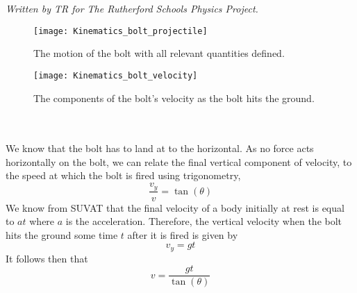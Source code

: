 
\begin{problem}[Tristan_Bolt_Thrower] %
{

 }
{\textit{Written by TR for The Rutherford Schools Physics Project.}}
{
\begin{figure}[h]
	\centering
	\texttt{[image: Kinematics\_bolt\_projectile]}
	\caption{The motion of the bolt with all relevant quantities defined.}
	\label{fig:Kinematics_projectile_arrow}
\end{figure}
\begin{figure}[h]
	\centering
	\texttt{[image: Kinematics\_bolt\_velocity]}
	\caption{The components of the bolt's velocity as the bolt hits the ground.}
	\label{fig:Kinematics_bolt_velocities}
\end{figure}
\\
\\
	We know that the bolt has to land at \quantity{\theta}{45\sup{\circ}} to the horizontal. As no force acts horizontally on the bolt, we can relate the final vertical component of velocity,  to the speed at which the bolt is fired using trigonometry,
	\begin{equation*}\frac{v_y}{v}=\tan(\theta)\end{equation*}
	We know from SUVAT that the final velocity of a body initially at rest is equal to $at$ where $a$ is the acceleration. Therefore, the vertical velocity when the bolt hits the ground some time $t$ after it is fired is given by
	\begin{equation*}v_y=gt\end{equation*}
	It follows then that
	\begin{equation}\label{Kinematics_bolt_1}v=\frac{gt}{\tan(\theta)}\end{equation}
}
\end{problem}
